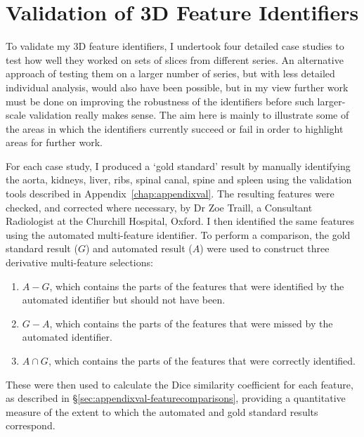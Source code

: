 
\section{Validation of 3D Feature Identifiers}


To validate my 3D feature identifiers, I undertook four detailed case studies to test how well they worked on sets of slices from different series. An alternative approach of testing them on a larger number of series, but with less detailed individual analysis, would also have been possible, but in my view further work must be done on improving the robustness of the identifiers before such larger-scale validation really makes sense. The aim here is mainly to illustrate some of the areas in which the identifiers currently succeed or fail in order to highlight areas for further work.

For each case study, I produced a `gold standard' result by manually identifying the aorta, kidneys, liver, ribs, spinal canal, spine and spleen using the validation tools described in Appendix~\ref{chap:appendixval}. The resulting features were checked, and corrected where necessary, by Dr Zoe Traill, a Consultant Radiologist at the Churchill Hospital, Oxford. I then identified the same features using the automated multi-feature identifier. To perform a comparison, the gold standard result ($G$) and automated result ($A$) were used to construct three derivative multi-feature selections:
%
\begin{enumerate}
\item $A - G$, which contains the parts of the features that were identified by the automated identifier but should not have been.
\item $G - A$, which contains the parts of the features that were missed by the automated identifier.
\item $A \cap G$, which contains the parts of the features that were correctly identified.
\end{enumerate}
%
These were then used to calculate the Dice similarity coefficient for each feature, as described in \S\ref{sec:appendixval-featurecomparisons}, providing a quantitative measure of the extent to which the automated and gold standard results correspond.


